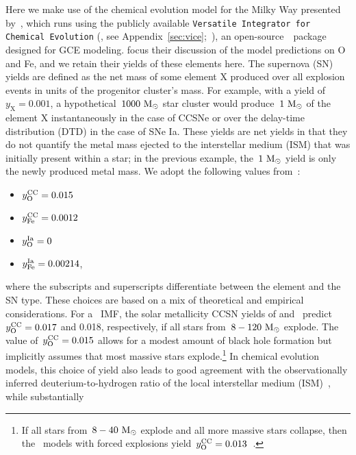 \documentclass[ms.tex]{subfiles}
\begin{document}
Here we make use of the chemical evolution model for the Milky Way
presented by~\citet{Johnson2021}, which runs using the publicly available
\texttt{Versatile Integrator for Chemical Evolution}
(\vice, see Appendix~\ref{sec:vice};~\citealp{Johnson2020, Griffith2021a,
Johnson2021}), an open-source~\python~package designed for GCE modeling.
\citet{Johnson2021} focus their discussion of the model predictions on O and
Fe, and we retain their yields of these elements here.
The supernova (SN) yields are defined as the net mass of some element X
produced over all explosion events in units of the progenitor cluster's mass.
For example, with a yield of~$y_\text{X} = 0.001$, a hypothetical~$1000~\text{M}_\odot$
star cluster would produce~$1~\text{M}_\odot$ of the element X instantaneously in the
case of CCSNe or over the delay-time distribution (DTD) in the case of SNe Ia.
These yields are net yields in that they do not quantify the metal mass
ejected to the interstellar medium (ISM) that was initially present within a
star; in the previous example, the~$1~\text{M}_\odot$ yield is only the newly produced
metal mass.
We adopt the following values from~\citet{Johnson2021}:
\begin{itemize}
	\item $y_\text{O}^\text{CC} = 0.015$

	\item $y_\text{Fe}^\text{CC} = 0.0012$

	\item $y_\text{O}^\text{Ia} = 0$

	\item $y_\text{Fe}^\text{Ia} = 0.00214$,
\end{itemize}
where the subscripts and superscripts differentiate between the element and the
SN type.
These choices are based on a mix of theoretical and empirical considerations.
For a~\citet{Kroupa2001} IMF, the solar metallicity CCSN yields of
\citet{Limongi2006} and~\citet[][based on the~\citealp{Sukhbold2016} models
with forced explosion]{Griffith2021a} predict~$y_\text{O}^\text{CC} = 0.017$ and 0.018,
respectively, if all stars from~$8 - 120~\text{M}_\odot$ explode.
The value of~$y_\text{O}^\text{CC} = 0.015$ allows for a modest amount of black hole
formation but implicitly assumes that most massive stars explode.\footnote{
	If all stars from~$8 - 40~\text{M}_\odot$ explode and all more massive stars
	collapse, then the~\citet{Sukhbold2016} models with forced explosions
	yield~$y_\text{O}^\text{CC} = 0.013$~\citep{Griffith2021a}.
}
In chemical evolution models, this choice of yield also leads to good agreement
with the observationally inferred deuterium-to-hydrogen ratio of the local
interstellar medium (ISM)~\citep{Linsky2006}, while substantially
\end{document}
